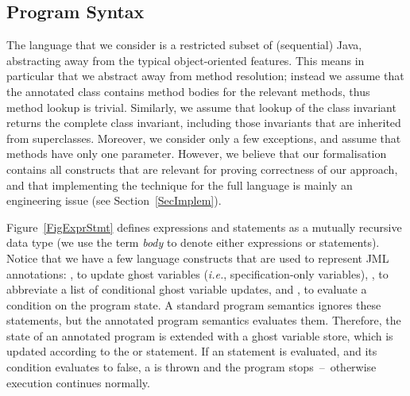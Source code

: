 \subsection{Program Syntax}\label{SecSyntax}

The language that we consider is a restricted subset of (sequential)
Java, abstracting away from the typical object-oriented features. This
means in particular that we abstract away from method resolution;
instead we assume that the annotated class contains method bodies for
the relevant methods, thus method lookup is trivial. Similarly, we
assume that lookup of the class invariant returns the complete class
invariant, including those invariants that are inherited from
superclasses. Moreover, we consider only a few exceptions, and assume
that methods have only one parameter. However, we believe that our
formalisation contains all constructs that are relevant for proving
correctness of our approach, and that implementing the technique for
the full language is mainly an engineering issue (see
Section~\ref{SecImplem}). %

Figure~\ref{FigExprStmt} defines expressions and statements as a
mutually recursive data type (we use the term \emph{body} to denote
either expressions or statements). Notice that we have a few language
constructs that are used to represent JML annotations: \Set, to update
ghost variables (\emph{i.e.}, specification-only variables), \CaseJML,
to abbreviate a list of conditional ghost variable updates, and
\Assert, to evaluate a condition on the program state. A standard
program semantics ignores these statements, but the annotated program
semantics evaluates them. Therefore, the state of an annotated
program is extended with a ghost variable store, which is updated
according to the \Set or \CaseJML statement. If an \Assert statement is
evaluated, and its condition evaluates to false, a \JMLExc is thrown and the
program stops~--~otherwise execution continues normally.

